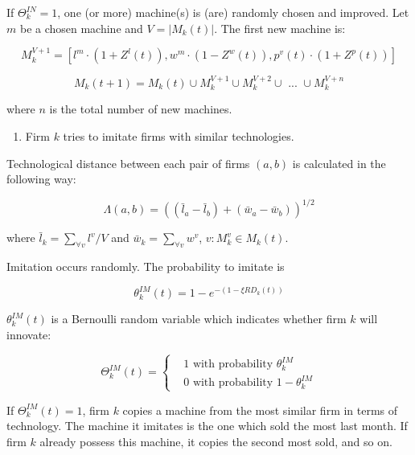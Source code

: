 \documentclass[11pt,]{article}
\providecommand{\tightlist}{%
\setlength{\itemsep}{0pt}\setlength{\parskip}{0pt}}
\begin{document}
If \(\Theta_k^{IN} = 1\), one (or more) machine(s) is (are) randomly
chosen and improved. Let \(m\) be a chosen machine and \(V = |M_k(t)|\).
The first new machine is:

\begin{equation}
  M_k^{V + 1} = [ l^m \cdot (1 + Z^l(t)), w^m \cdot (1- Z^w(t)), p^v(t) \cdot (1 + Z^p(t)) ]
\end{equation}

\begin{equation}
  M_k(t+1) = M_k(t) \cup M_k^{V + 1} \cup M_k^{V + 2} \cup \text{ ... } \cup M_k^{V + n}
\end{equation}

where \(n\) is the total number of new machines.

\begin{enumerate}
\def\labelenumi{\alph{enumi}.}
\setcounter{enumi}{1}
\tightlist
\item
  Firm \(k\) tries to imitate firms with similar technologies.
\end{enumerate}

Technological distance between each pair of firms \((a,b)\) is
calculated in the following way:

\begin{equation}
  \Lambda(a,b) = ((\bar{l}_a - \bar{l}_b) + (\bar{w}_a - \bar{w}_b))^{1/2}
\end{equation}

where \(\bar{l}_k = \sum_{\forall v} l^v / V\) and
\(\bar{w}_k = \sum_{\forall v} w^v\), \(v : M_k^v \in M_k(t)\).

Imitation occurs randomly. The probability to imitate is

\begin{equation}
  \theta_k^{IM}(t) = 1 - e^{-(1 - \xi RD_k(t))}
\end{equation}

\(\theta_k^{IM}(t)\) is a Bernoulli random variable which indicates
whether firm \(k\) will innovate:

\begin{equation}
  \Theta_k^{IM}(t) = 
  \begin{cases}
    & 1 \text{ with probability } \theta_k^{IM} \\
    & 0 \text{ with probability } 1 - \theta_k^{IM}
  \end{cases}
\end{equation}

If \(\Theta_k^{IM}(t) = 1\), firm \(k\) copies a machine from the most
similar firm in terms of technology. The machine it imitates is the one
which sold the most last month. If firm \(k\) already possess this
machine, it copies the second most sold, and so on.
\end{document}
